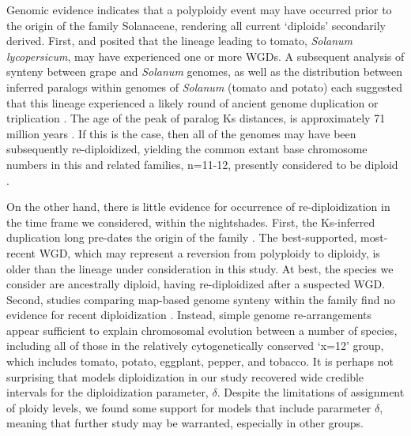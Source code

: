 Genomic evidence indicates that a polyploidy event may have occurred prior to the origin of the family Solanaceae, rendering all current `diploids' secondarily derived. 
First, \citet{ku2000} and \citet{blanc2004} posited that the lineage leading to tomato, \textit{Solanum lycopersicum}, may have experienced one or more WGDs.
A subsequent analysis of synteny between grape and \textit{Solanum} genomes, as well as the distribution between inferred paralogs within genomes of \textit{Solanum} (tomato and potato) each suggested that this lineage experienced a likely round of ancient genome duplication or triplication \citep{tomato2012}. 
The age of the peak of paralog Ks distances, is approximately 71 million years \citep{tomato2012}. 
If this is the case, then all of the genomes may have been subsequently re-diploidized, yielding the common extant base chromosome numbers in this and related families, n=11-12, presently considered to be diploid \citep{robertson_2011}. 

On the other hand, there is little evidence for occurrence of re-diploidization in the time frame we considered, within the nightshades.
First, the Ks-inferred duplication long pre-dates the origin of the family \citep{sarkinen_2013}. 
The best-supported, most-recent WGD, which may represent a reversion from polyploidy to diploidy, is older than the lineage under consideration in this study.
At best, the species we consider are ancestrally diploid, having re-diploidized after a suspected WGD.
Second, studies comparing map-based genome synteny within the family find no evidence for recent diploidization \citep{wu_2010a}.
Instead, simple genome re-arrangements appear sufficient to explain chromosomal evolution between a number of species, including all of those in the relatively cytogenetically conserved `x=12' group, which includes tomato, potato, eggplant, pepper, and tobacco.
It is perhaps not surprising that models diploidization in our study recovered wide credible intervals for the diploidization parameter, $\delta$. 
Despite the limitations of assignment of ploidy levels, we found some support for models that include pararmeter $\delta$, meaning that further study may be warranted, especially in other groups.

